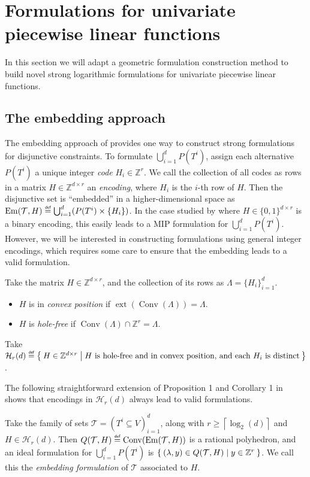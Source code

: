 \documentclass[opre,nonblindrev]{informs3} %
\newcommand{\bbZ}{\mathbb{Z}}
\newcommand{\calT}{\mathcal{T}}
\newcommand{\Conv}{\operatorname{Conv}}
\newcommand{\Em}{\operatorname{Em}}
\newcommand{\ext}{\operatorname{ext}}
\newcommand\defeq{\mathrel{\overset{\makebox[0pt]{\mbox{\normalfont\tiny\sffamily def}}}{=}}}
\begin{document}
\section{Formulations for univariate piecewise linear functions} \label{sec:univariate}

In this section we will adapt a geometric formulation construction method to build novel strong logarithmic formulations for univariate piecewise linear functions.


\subsection{The embedding approach} \label{ssec:embedding-approach}
The embedding approach of \cite{Vielma:2016} provides one way to construct strong formulations for disjunctive constraints. To formulate $\bigcup_{i=1}^d P(T^i)$, assign each alternative $P(T^i)$ a unique integer \emph{code} $H_i \in \bbZ^r$. We call the collection of all codes as rows in a matrix $H \in \bbZ^{d \times r}$ an \emph{encoding}, where $H_i$ is the $i$-th row of $H$. Then the disjunctive set is ``embedded'' in a higher-dimensional space as $\Em(\calT,H) \defeq \bigcup_{i=1}^d (P(T^i) \times \{H_i\})$. In the case studied by \cite{Vielma:2016} where $H \in \{0,1\}^{d \times r}$ is a binary encoding, this easily leads to a MIP formulation for $\bigcup_{i=1}^d P(T^i)$. However, we will be interested in constructing formulations using general integer encodings, which requires some care to ensure that the embedding leads to a valid formulation.


\begin{definition}
Take the matrix $H \in \bbZ^{d \times r}$, and the collection of its rows as $\Lambda = \{H_i\}_{i=1}^d$.
\begin{itemize}
	\item $H$ is in \emph{convex position} if $\ext(\Conv(\Lambda)) = \Lambda$.
	\item $H$ is \emph{hole-free} if $\Conv(\Lambda) \cap \bbZ^r = \Lambda$.
\end{itemize}
Take $\mathcal{H}_r(d)\defeq \Set{ H\in \mathbb{Z}^{d\times r} | H \text{ is hole-free and in convex position, and each } H_i \text{ is distinct}}$.
\end{definition}

The following straightforward extension of Proposition 1 and Corollary 1 in \cite{Vielma:2016} shows that encodings in $\mathcal{H}_r(d)$ always lead to valid formulations. 
\begin{proposition}\label{firstprop}
Take the family of sets $\calT = (T^i \subseteq V)_{i=1}^d$, along with $r\geq \left\lceil \log_2 (d)\right\rceil$ and $H \in \mathcal{H}_r(d)$. Then $Q(\calT,H) \defeq \Conv(\Em(\calT,H))$ is a rational polyhedron, and an ideal formulation for $\bigcup_{i=1}^d P(T^i)$ is $\Set{(\lambda,y) \in Q(\calT,H) | y \in \bbZ^r }$. We call this the \emph{embedding formulation} of $\calT$ associated to $H$.
\end{proposition}
\end{document}
